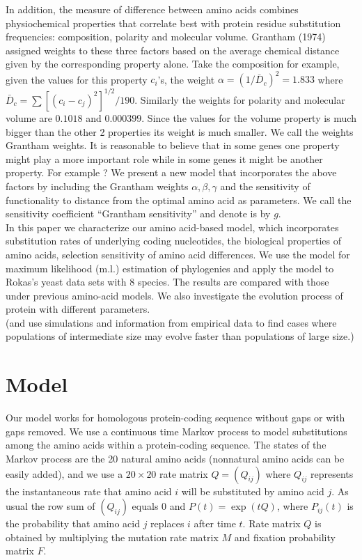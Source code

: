 \documentclass[13pt]{article}
\begin{document}
In addition, the measure of difference between amino acids combines physiochemical properties that correlate best with protein residue substitution frequencies: composition, polarity and molecular volume. Grantham (1974) assigned weights to these three factors based on the average chemical distance given by the corresponding property alone. Take the composition for example, given the values for this property $c_i$'s, the weight $\alpha = (1/\bar{D}_c)^2 = 1.833$ where $\bar{D}_c = \sum[(c_i - c_j)^2]^{1/2}/190$. Similarly the weights for polarity and molecular volume are $0.1018$ and $0.000399$. Since the values for the volume property is much bigger than the other 2 properties its weight is much smaller. We call the weights Grantham weights. It is reasonable to believe that in some genes one property might play a more important role while in some genes it might be another property. For example ?  We present a new model that incorporates the above factors by including the Grantham weights $\alpha, \beta, \gamma$ and the sensitivity of functionality to distance from the optimal amino acid as parameters. We call the sensitivity coefficient ``Grantham sensitivity'' and denote is by $g$.\\

In this paper we characterize our amino acid-based model, which incorporates substitution rates of underlying coding nucleotides, the biological properties of amino acids, selection sensitivity of amino acid differences. We use the model for maximum likelihood (m.l.) estimation of phylogenies and apply the model to Rokas's yeast data sets with 8 species. The results are compared with those under previous amino-acid models. We also investigate the evolution process of protein with different parameters.\\
(and use simulations and information from empirical data to find cases where populations of intermediate size may evolve faster than populations of large size.)

\section{Model}
Our model works for homologous protein-coding sequence without gaps or with gaps removed. We use a continuous time Markov process to model substitutions among the amino acids within a protein-coding sequence. The states of the Markov process are the 20 natural amino acids (nonnatural amino acids can be easily added), and we use a $20 \times 20$ rate matrix $Q=(Q_{ij})$ where $Q_{ij}$ represents the instantaneous rate that amino acid $i$ will be substituted by amino acid $j$. As usual the row sum of $(Q_{ij})$ equals $0$ and $P(t) = \exp (tQ)$, where $P_{ij}(t)$ is the probability that amino acid $j$ replaces $i$ after time $t$. Rate matrix $Q$ is obtained by multiplying the mutation rate matrix $M$ and fixation probability matrix $F$.\\
\end{document}
